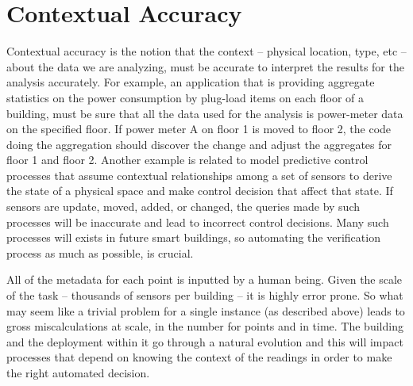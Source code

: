 

\section{Contextual Accuracy}
\label{sec:cntxtacc}

Contextual accuracy is the notion that the context -- physical location, type, etc -- about the data we are analyzing, must be accurate
to interpret the results for the analysis accurately.  For example, an application that is providing aggregate statistics on the 
power consumption by plug-load items on each floor of a building, must be sure that all the data used for the analysis 
is power-meter data on the specified floor.  If power meter A on floor 1 is moved to floor 2, the code doing the aggregation
should discover the change and adjust the aggregates for floor 1 and floor 2.  Another example is related to model predictive 
control processes that assume contextual relationships among a set of sensors to derive the state of a physical space and 
make control decision that affect that state.  If sensors are update, moved, added, or changed, the queries made by such processes
will be inaccurate and lead to incorrect control decisions.  Many such processes will exists in future smart buildings, so
automating the verification process as much as possible, is crucial.

All of the metadata for each point is inputted by a human being.  Given the scale of the task -- thousands of sensors per building --
it is highly error prone.  So what may seem like a trivial problem for a single instance (as described above) leads to gross
miscalculations at scale, in the number for points and in time.  The building and the deployment within it go through a natural
evolution and this will impact processes that depend on knowing the context of the readings in order to make the right automated decision.

